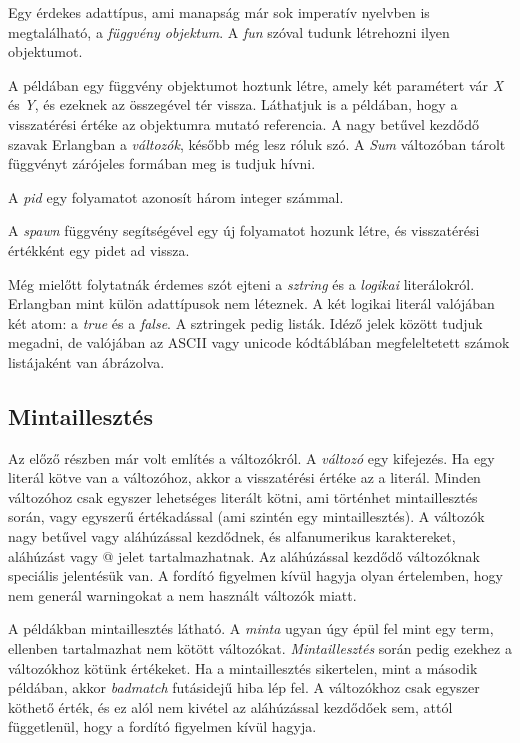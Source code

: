 

Egy érdekes adattípus, ami manapság már sok imperatív nyelvben is megtalálható, a \textit{függvény objektum}. A \textit{fun} szóval tudunk létrehozni ilyen objektumot.



A példában egy függvény objektumot hoztunk létre, amely két paramétert vár \textit{X} és \textit{Y}, és ezeknek az összegével tér vissza. Láthatjuk is a példában, hogy a visszatérési értéke az objektumra mutató referencia. A nagy betűvel kezdődő szavak Erlangban a \textit{változók}, később még lesz róluk szó. A \textit{Sum} változóban tárolt függvényt zárójeles formában meg is tudjuk hívni.

A \textit{pid} egy folyamatot azonosít három integer számmal.



A \textit{spawn} függvény segítségével egy új folyamatot hozunk létre, és visszatérési értékként egy pidet ad vissza.

Még mielőtt folytatnák érdemes szót ejteni a \textit{sztring} és a \textit{logikai} literálokról. Erlangban mint külön adattípusok nem léteznek. A két logikai literál valójában két atom: a \textit{true} és a \textit{false}. A sztringek pedig listák. Idéző jelek között tudjuk megadni, de valójában az ASCII vagy unicode kódtáblában megfeleltetett számok listájaként van ábrázolva.

\subsection{Mintaillesztés}
Az előző részben már volt említés a változókról. A \textit{változó} egy kifejezés. Ha egy literál kötve van a változóhoz, akkor a visszatérési értéke az a literál. Minden változóhoz csak egyszer lehetséges literált kötni, ami történhet mintaillesztés során, vagy egyszerű értékadással (ami szintén egy mintaillesztés). A változók nagy betűvel vagy aláhúzással kezdődnek, és alfanumerikus karaktereket, aláhúzást vagy @ jelet tartalmazhatnak. Az aláhúzással kezdődő változóknak speciális jelentésük van. A fordító figyelmen kívül hagyja olyan értelemben, hogy nem generál warningokat a nem használt változók miatt.



A példákban mintaillesztés látható. A \textit{minta} ugyan úgy épül fel mint egy term, ellenben tartalmazhat nem kötött változókat. \textit{Mintaillesztés} során pedig ezekhez a változókhoz kötünk értékeket. Ha a mintaillesztés sikertelen, mint a második példában, akkor \textit{badmatch} futásidejű hiba lép fel. A változókhoz csak egyszer köthető érték, és ez alól nem kivétel az aláhúzással kezdődőek sem, attól függetlenül, hogy a fordító figyelmen kívül hagyja.

